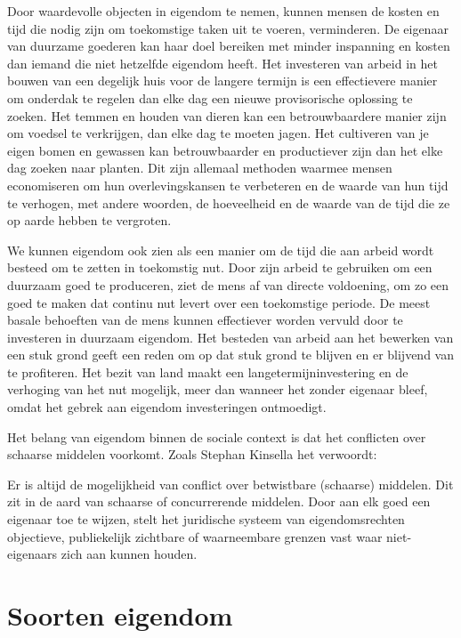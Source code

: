 Door waardevolle objecten in eigendom te nemen, kunnen mensen de kosten en tijd die nodig zijn om toekomstige taken uit te voeren, verminderen. De eigenaar van duurzame goederen kan haar doel bereiken met minder inspanning en kosten dan iemand die niet hetzelfde eigendom heeft. Het investeren van arbeid in het bouwen van een degelijk huis voor de langere termijn is een effectievere manier om onderdak te regelen dan elke dag een nieuwe provisorische oplossing te zoeken. Het temmen en houden van dieren kan een betrouwbaardere manier zijn om voedsel te verkrijgen, dan elke dag te moeten jagen. Het cultiveren van je eigen bomen en gewassen kan betrouwbaarder en productiever zijn dan het elke dag zoeken naar planten. Dit zijn allemaal methoden waarmee mensen economiseren om hun overlevingskansen te verbeteren en de waarde van hun tijd te verhogen, met andere woorden, de hoeveelheid en de waarde van de tijd die ze op aarde hebben te vergroten.

We kunnen eigendom ook zien als een manier om de tijd die aan arbeid wordt besteed om te zetten in toekomstig nut. Door zijn arbeid te gebruiken om een duurzaam goed te produceren, ziet de mens af van directe voldoening, om zo een goed te maken dat continu nut levert over een toekomstige periode. De meest basale behoeften van de mens kunnen effectiever worden vervuld door te investeren in duurzaam eigendom. Het besteden van arbeid aan het bewerken van een stuk grond geeft een reden om op dat stuk grond te blijven en er blijvend van te profiteren. Het bezit van land maakt een langetermijninvestering en de verhoging van het nut mogelijk, meer dan wanneer het zonder eigenaar bleef, omdat het gebrek aan eigendom investeringen ontmoedigt.

Het belang van eigendom binnen de sociale context is dat het conflicten over schaarse middelen voorkomt. Zoals Stephan Kinsella het verwoordt:

\begin{blockquotebox}
    Er is altijd de mogelijkheid van conflict over betwistbare (schaarse) middelen. Dit zit in de aard van schaarse of concurrerende middelen. Door aan elk goed een eigenaar toe te wijzen, stelt het juridische systeem van eigendomsrechten objectieve, publiekelijk zichtbare of waarneembare grenzen vast waar niet-eigenaars zich aan kunnen houden.\footnotemark
\end{blockquotebox}


\section{Soorten eigendom}

